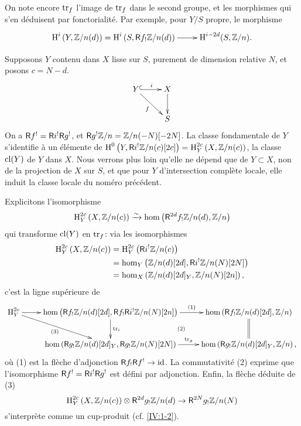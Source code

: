 On note encore $\operatorname{tr}_f$ l'image de $\operatorname{tr}_f$ dans le second groupe, et les 
morphismes qui s'en d\'eduisent par fonctorialit\'e. Par exemple, pour $Y/S$ 
propre, le morphisme 
\begin{equation}\label{IV:eq:2-3-1-3}
\xymatrix{
  \h^i\left(Y,\dZ/n(d)\right) = \h^i\left(S,\R f_!\dZ/n(d)\right) \ar[r] 
    & \h^{i-2 d}(S,\dZ/n) \text{.}
}
\end{equation}

Supposons $Y$ contenu dans $X$ lisse sur $S$, purement de dimension relative 
$N$, et posons $c=N-d$. 
\[\xymatrix{
  Y \ar@{^{(}->}[r]^-i \ar[dr]_-f 
    & X \ar[d] \\
  & S
}\]
On a $\mathsf{R} f^! = \mathsf{R} i^!\mathsf{R} g^!$, et $\mathsf{R} g^! \mathbb{Z}/n=\mathbb{Z}/n(-N)[-2 N]$. La classe 
fondamentale de $Y$ s'identifie \`a un \'el\'emente de 
$\operatorname{H}^0\left(Y,\mathsf{R} i^!\mathbb{Z}/n(c)[2 c]\right)=\operatorname{H}_Y^{2 c}\left(X,\mathbb{Z}/n(c)\right)$, la 
classe $\operatorname{cl}(Y)$ de $Y$ dans $X$. Nous verrons plus loin qu'elle ne d\'epend que 
de $Y\subset X$, non de la projection de $X$ sur $S$, et que pour $Y$ 
d'intersection compl\`ete locale, elle induit la classe locale du nom\'ero 
pr\'ec\'edent. 

Explicitons l'isomorphisme 
\[
  \operatorname{H}_Y^{2 c}\left(X,\mathbb{Z}/n(c)\right) \xrightarrow\sim \hom\left(\mathsf{R}^{2 d}f_!\mathbb{Z}/n(d),\mathbb{Z}/n\right)
\]
qui transforme $\operatorname{cl}(Y)$ en $\operatorname{tr}_f$: via les isomorphismes 
\begin{align*}
  \operatorname{H}_Y^{2 c}\left(X,\mathbb{Z}/n(c)\right) 
    &= \operatorname{H}_Y^{2 c}\left(\mathsf{R} i^!\mathbb{Z}/n(c)\right) \\
    &= \hom_Y\left(\mathbb{Z}/n(d)[2 d],\mathsf{R} i^!\mathbb{Z}/n(N)[2 N]\right) \\
    &= \hom_X\left(\mathbb{Z}/n(d)[2 d]_Y,\mathbb{Z}/n(N)[2 n]\right) \text{,}
\end{align*}
c'est la ligne sup\'erieure de 
\[\xymatrix{
  \h_Y^{2 c} \ar[r] \ar[dr]_-{(3)} 
    & \hom\left(\R f_!\dZ/n(d)[2 d],\R f_! \R i^!\dZ/n(N)[2 n]\right) \ar[r]^-{(1)} \ar[d]^-{\tr_i} \ar@{}[dr]|-{(2)}
    & \hom\left(\R f_!\dZ/n(d)[2d],\dZ/n\right) \ar@{=}[d] \\
  & \hom\left(\R g_!\dZ/n(d)[2 d]_Y,\R g_!\dZ/n(N)[2 N]\right) \ar[r]^-{\tr_g} 
    & \hom\left(\R g_!\dZ/n(d)[2 d]_Y,\dZ/n\right) \text{,}
}\]
o\`u (1) est la fl\`eche d'adjonction $\mathsf{R} f_!\mathsf{R} f^!\to \text{id}$. La 
commutativit\'e (2) exprime que l'isomorphisme $\mathsf{R} f^!=\mathsf{R} i^!\mathsf{R} g^!$ est 
d\'efini par adjonction. Enfin, la fl\`eche d\'eduite de (3)
\[
  \operatorname{H}_Y^{2c}\left(X,\mathbb{Z}/n(c)\right) \otimes \mathsf{R}^{2 d} g_!\mathbb{Z}/n(d) \to \mathsf{R}^{2 N} g_!\mathbb{Z}/n(N)
\]
s'interpr\`ete comme un cup-produit (cf. \ref{IV:1-2}). 





